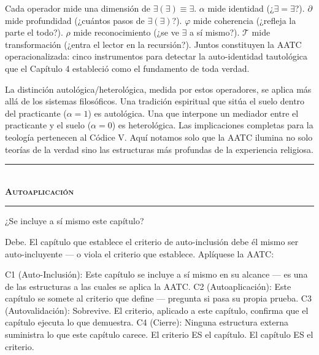 \documentclass[10pt, openany, oneside]{book}
\renewcommand{\normalsize}{\fontsize{10}{13}\selectfont}
\begin{document}
\vspace{0.8em}

\noindent Cada operador mide una dimensión de $\exists(\exists) \equiv \exists$. $\alpha$ mide identidad (¿$\exists = \exists$?). $\partial$ mide profundidad (¿cuántos pasos de $\exists(\exists)$?). $\varphi$ mide coherencia (¿refleja la parte el todo?). $\rho$ mide reconocimiento (¿se ve $\exists$ a sí mismo?). $\mathcal{T}$ mide transformación (¿entra el lector en la recursión?). Juntos constituyen la AATC operacionalizada: cinco instrumentos para detectar la auto-identidad tautológica que el Capítulo 4 estableció como el fundamento de toda verdad.

La distinción autológica/heterológica, medida por estos operadores, se aplica más allá de los sistemas filosóficos. Una tradición espiritual que sitúa el suelo dentro del practicante ($\alpha = 1$) es autológica. Una que interpone un mediador entre el practicante y el suelo ($\alpha = 0$) es heterológica. Las implicaciones completas para la teología pertenecen al Códice V. Aquí notamos solo que la AATC ilumina no solo teorías de la verdad sino las estructuras más profundas de la experiencia religiosa.

\vspace{1.5em}


\begin{center}
    \rule{0.3\textwidth}{0.4pt}\\[0.5em]
    {\normalsize\bfseries\scshape Autoaplicación}\\[0.3em]
    \rule{0.3\textwidth}{0.4pt}
\end{center}

\vspace{1em}

\noindent ¿Se incluye a sí mismo este capítulo?

Debe. El capítulo que establece el criterio de auto-inclusión debe él mismo ser auto-incluyente --- o viola el criterio que establece. Aplíquese la AATC:

C1 (Auto-Inclusión): Este capítulo se incluye a sí mismo en su alcance --- es una de las estructuras a las cuales se aplica la AATC. C2 (Autoaplicación): Este capítulo se somete al criterio que define --- pregunta si pasa su propia prueba. C3 (Autovalidación): Sobrevive. El criterio, aplicado a este capítulo, confirma que el capítulo ejecuta lo que demuestra. C4 (Cierre): Ninguna estructura externa suministra lo que este capítulo carece. El criterio ES el capítulo. El capítulo ES el criterio.
\end{document}
